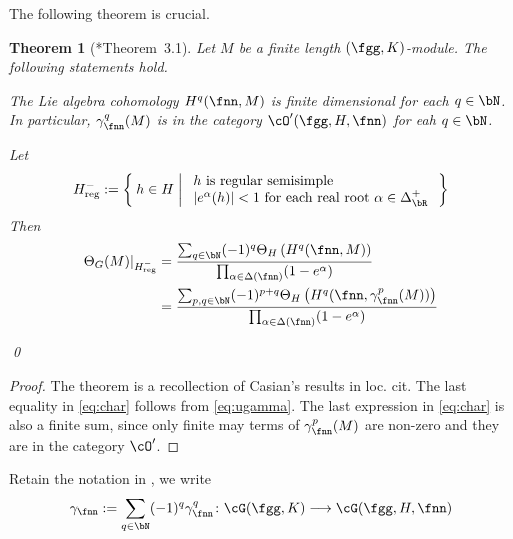 \documentclass[12pt,a4paper]{amsart}
\def\abs#1{\left|{#1}\right|}
\DeclareMathOperator{\Ann}{Ann}
\numberwithin{equation}{section}
\newtheorem{thm}{Theorem}[section]
\theoremstyle{remark}
\def\WT#1{\Delta(#1)}
\def\Coh{\mathrm{Coh}}
\def\Hnreg{H^-_{\text{reg}}}
\begin{document}
The following theorem is crucial.
\begin{thm}[\cite{Cas}*{Theorem~3.1}]\label{thm:gamma.HC}
  Let $M$ be a finite length $(\fgg,K)$-module. The following statements hold.
  \begin{enumT}
    \item The Lie algebra cohomology $H^{q}(\fnn,M)$ is finite dimensional for
    each $q\in \bN$. In particular, $\gamma_{\fnn}^{q}(M)$ is in the category
    $\cO'(\fgg,H,\fnn)$ for eah $q\in \bN$.
    \item
    Let
    \[
      \Hnreg:= \Set{h\in H|
        \begin{array}{l}
          \text{$h$ is regular semisimple}\\
          \abs{e^{\alpha}(h)}<1 \text{ for each real root }
          \alpha\in \Delta^{+}_{\bR}
        \end{array}
      }
    \]
    Then
    \begin{equation}\label{eq:char}
      \begin{split}
        \Theta_{G}(M)|_{\Hnreg} &= \frac{\sum_{q\in \bN} (-1)^{q}\Theta_{H} \left(H^{q}(\fnn,M)\right)}
        {\prod_{\alpha\in \WT{\fnn}}(1- e^{\alpha})}\\
        &= \frac{\sum_{p,q\in \bN} (-1)^{p+q}\Theta_{H} \left(H^{q}(\fnn,\gamma_{\fnn}^{p}(M))\right)}
        {\prod_{\alpha\in \WT{\fnn}}(1- e^{\alpha})}\\
      \end{split}
    \end{equation}
  \end{enumT}
  \qed
\end{thm}
\begin{proof}
  The theorem is a recollection of Casian's results in loc. cit. The last
  equality in \eqref{eq:char} follows from \eqref{eq:ugamma}. The last
  expression in \eqref{eq:char} is also a finite sum, since only finite may
  terms of $\gamma_{\fnn}^{p}(M)$ are non-zero and they are in the category
  $\cO'$.
\end{proof}


Retain the notation in , we write
\[
  \gamma_{\fnn}:= \sum_{q\in \bN} (-1)^{q} \gamma^{q}_{\fnn}\colon \Grt(\fgg,K) \longrightarrow \Grt(\fgg,H,\fnn)
\]

\end{document}
